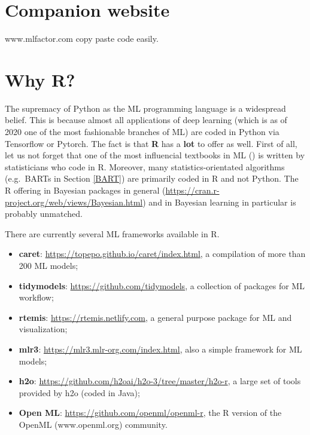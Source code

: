 \documentclass[]{krantz}
\providecommand{\tightlist}{%
  \setlength{\itemsep}{0pt}\setlength{\parskip}{0pt}}
\theoremstyle{definition}
\theoremstyle{definition}
\theoremstyle{definition}
\theoremstyle{remark}
\begin{document}
\hypertarget{companion-website}{%
\section{Companion website}\label{companion-website}}

www.mlfactor.com copy paste code easily.

\hypertarget{why-r}{%
\section{Why R?}\label{why-r}}

The supremacy of Python as the ML programming language is a widespread
belief. This is because almost all applications of deep learning (which
is as of 2020 one of the most fashionable branches of ML) are coded in
Python via Tensorflow or Pytorch. The fact is that \textbf{R} has a
\textbf{lot} to offer as well. First of all, let us not forget that one
of the most influencial textbooks in ML (\citet{friedman2009elements})
is written by statisticians who code in R. Moreover, many
statistics-orientated algorithms (e.g.~BARTs in Section \ref{BART}) are
primarily coded in R and not Python. The R offering in Bayesian packages
in general (\url{https://cran.r-project.org/web/views/Bayesian.html})
and in Bayesian learning in particular is probably unmatched.

There are currently several ML frameworks available in R.

\begin{itemize}
\tightlist
\item
  \textbf{caret}: \url{https://topepo.github.io/caret/index.html}, a
  compilation of more than 200 ML models;\\
\item
  \textbf{tidymodels}: \url{https://github.com/tidymodels}, a collection
  of packages for ML workflow;\\
\item
  \textbf{rtemis}: \url{https://rtemis.netlify.com}, a general purpose
  package for ML and visualization;\\
\item
  \textbf{mlr3}: \url{https://mlr3.mlr-org.com/index.html}, also a
  simple framework for ML models;\\
\item
  \textbf{h2o}: \url{https://github.com/h2oai/h2o-3/tree/master/h2o-r},
  a large set of tools provided by h2o (coded in Java);\\
\item
  \textbf{Open ML}: \url{https://github.com/openml/openml-r}, the R
  version of the OpenML (www.openml.org) community.
\end{itemize}
\end{document}
